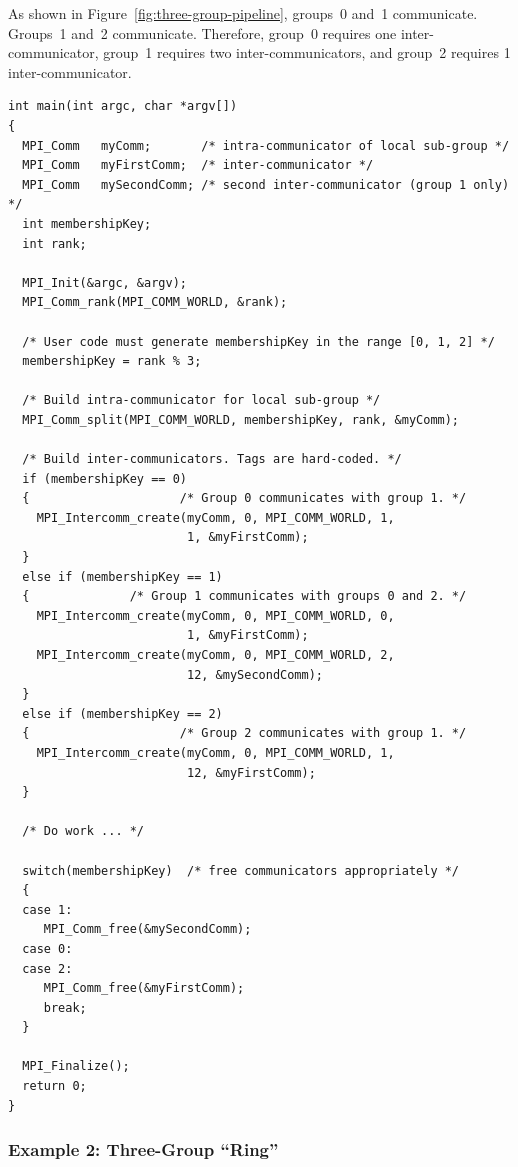As shown in Figure~\ref{fig:three-group-pipeline},
groups~0 and~1 communicate. Groups~1 and~2 communicate. Therefore, group~0
requires one inter-communicator, group~1 requires two
inter-communicators, and group~2 requires 1 inter-communicator.


\begin{example}
%
\begin{lstlisting}[language={[MPI]C},basicstyle=\lstsmall]
int main(int argc, char *argv[])
{
  MPI_Comm   myComm;       /* intra-communicator of local sub-group */
  MPI_Comm   myFirstComm;  /* inter-communicator */
  MPI_Comm   mySecondComm; /* second inter-communicator (group 1 only) */
  int membershipKey;
  int rank;

  MPI_Init(&argc, &argv);
  MPI_Comm_rank(MPI_COMM_WORLD, &rank);

  /* User code must generate membershipKey in the range [0, 1, 2] */
  membershipKey = rank % 3;

  /* Build intra-communicator for local sub-group */
  MPI_Comm_split(MPI_COMM_WORLD, membershipKey, rank, &myComm);

  /* Build inter-communicators. Tags are hard-coded. */
  if (membershipKey == 0)
  {                     /* Group 0 communicates with group 1. */
    MPI_Intercomm_create(myComm, 0, MPI_COMM_WORLD, 1,
                         1, &myFirstComm);
  }
  else if (membershipKey == 1)
  {              /* Group 1 communicates with groups 0 and 2. */
    MPI_Intercomm_create(myComm, 0, MPI_COMM_WORLD, 0,
                         1, &myFirstComm);
    MPI_Intercomm_create(myComm, 0, MPI_COMM_WORLD, 2,
                         12, &mySecondComm);
  }
  else if (membershipKey == 2)
  {                     /* Group 2 communicates with group 1. */
    MPI_Intercomm_create(myComm, 0, MPI_COMM_WORLD, 1,
                         12, &myFirstComm);
  }

  /* Do work ... */

  switch(membershipKey)  /* free communicators appropriately */
  {
  case 1:
     MPI_Comm_free(&mySecondComm);
  case 0:
  case 2:
     MPI_Comm_free(&myFirstComm);
     break;
  }

  MPI_Finalize();
  return 0;
}
\end{lstlisting}
\end{example}

\subsubsection{Example 2:  Three-Group ``Ring''}
\label{context-ex8}

